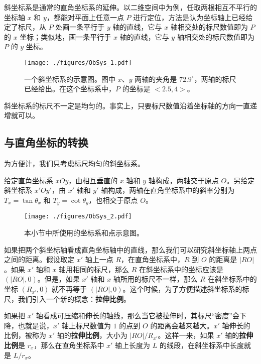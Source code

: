 

斜坐标系是通常的直角坐标系的延伸。以二维空间中为例，任取两根相互不平行的坐标轴 $x$ 和 $y$，都能对平面上任意一点 $P$ 进行定位，方法是认为坐标轴上已经给定了标尺，从 $P$ 处画一条平行于 $y$ 轴的直线，它与 $x$ 轴相交处的标尺数值即为 $P$ 的 $x$ 坐标；类似地，画一条平行于 $x$ 轴的直线，它与 $y$ 轴相交处的标尺数值即为 $P$ 的 $y$ 坐标。

\begin{figure}[ht]
\centering
\texttt{[image: ./figures/ObSys\_1.pdf]}
\caption{一个斜坐标系的示意图。图中 $x$、$y$ 两轴的夹角是 $72.9^\circ$，两轴的标尺已经给出。在这个坐标系中，$P$ 的坐标是 $<2.5, 4>$。} \label{ObSys_fig1}
\end{figure}

斜坐标系的标尺不一定是均匀的。事实上，只要标尺数值沿着坐标轴的方向一直递增就可以。

\subsection{与直角坐标的转换}

为方便计，我们只考虑标尺均匀的斜坐标系。

给定直角坐标系 $xOy$，由相互垂直的 $x$ 轴和 $y$ 轴构成，两轴交于原点 $O$。另给定斜坐标系 $x'Oy'$，由 $x'$ 轴和 $y'$ 轴构成，两轴在直角坐标系中的斜率分别为 $T_x=\tan{\theta_x}$ 和 $T_y=\cot{\theta_y}$，也相交于原点 $O$。

\begin{figure}[ht]
\centering
\texttt{[image: ./figures/ObSys\_2.pdf]}
\caption{本小节中所使用的坐标系和点示意图。} \label{ObSys_fig2}
\end{figure}

如果把两个斜坐标轴看成直角坐标轴中的直线，那么我们可以研究斜坐标轴上两点之间的距离。假设取定 $x'$ 轴上一点 $R$，在直角坐标系中，$R$ 到 $O$ 的距离是 $|RO|$。如果 $x'$ 轴和 $x$ 轴用相同的标尺，那么 $R$ 在斜坐标系中的坐标应该是 $(|RO|, 0)$。但是，如果 $x'$ 轴和 $x$ 轴所用的标尺不一样，那么 $R$ 在斜坐标系中的坐标 $(R_{x'},0)$ 就不再等于 $(|RO|, 0)$。这个时候，为了方便描述斜坐标系的标尺，我们引入一个新的概念：\textbf{拉伸比例}。

如果把 $x'$ 轴看成可压缩和伸长的轴线，那么当它被拉伸时，其标尺“密度”会下降，也就是说，$x'$ 轴上标尺数值为 $1$ 的点到 $O$ 的距离会越来越大。$x'$ 轴伸长的比例，被称为 $x'$ 轴的\textbf{拉伸比例}，大小为 $|RO|/R_{x'}$。这样一来，如果 $x'$ 轴的\textbf{拉伸比例}是 $r_x$，那么在直角坐标系中 $x'$ 轴上长度为 $L$ 的线段，在斜坐标系中长度就是 $L/r_x$。

